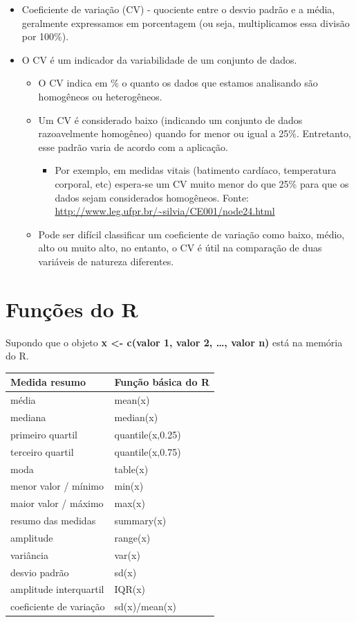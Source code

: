 \documentclass[
]{book}
\providecommand{\tightlist}{%
  \setlength{\itemsep}{0pt}\setlength{\parskip}{0pt}}
\begin{document}
\begin{itemize}
\item
  Coeficiente de variação (CV) - quociente entre o desvio padrão e a média, geralmente expressamos em porcentagem (ou seja, multiplicamos essa divisão por 100\%).
\item
  O CV é um indicador da variabilidade de um conjunto de dados.

  \begin{itemize}
  \item
    O CV indica em \% o quanto os dados que estamos analisando são homogêneos ou heterogêneos.
  \item
    Um CV é considerado baixo (indicando um conjunto de dados razoavelmente homogêneo) quando for menor ou igual a 25\%. Entretanto, esse padrão varia de acordo com a aplicação.

    \begin{itemize}
    \tightlist
    \item
      Por exemplo, em medidas vitais (batimento cardíaco, temperatura corporal, etc) espera-se um CV muito menor do que 25\% para que os dados sejam considerados homogêneos. Fonte: \url{http://www.leg.ufpr.br/~silvia/CE001/node24.html}
    \end{itemize}
  \item
    Pode ser difícil classificar um coeficiente de variação como baixo, médio, alto ou muito alto, no entanto, o CV é útil na comparação de duas variáveis de natureza diferentes.
  \end{itemize}
\end{itemize}

\hypertarget{funuxe7uxf5es-do-r}{%
\section{Funções do R}\label{funuxe7uxf5es-do-r}}

Supondo que o objeto \textbf{x \textless- c(valor 1, valor 2, \ldots, valor n)} está na memória do R.

\begin{longtable}[]{@{}ll@{}}
\toprule()
Medida resumo & Função básica do R \\
\midrule()
\endhead
média & mean(x) \\
mediana & median(x) \\
primeiro quartil & quantile(x,0.25) \\
terceiro quartil & quantile(x,0.75) \\
moda & table(x) \\
menor valor / mínimo & min(x) \\
maior valor / máximo & max(x) \\
resumo das medidas & summary(x) \\
amplitude & range(x) \\
variância & var(x) \\
desvio padrão & sd(x) \\
amplitude interquartil & IQR(x) \\
coeficiente de variação & sd(x)/mean(x) \\
\bottomrule()
\end{longtable}
\end{document}
